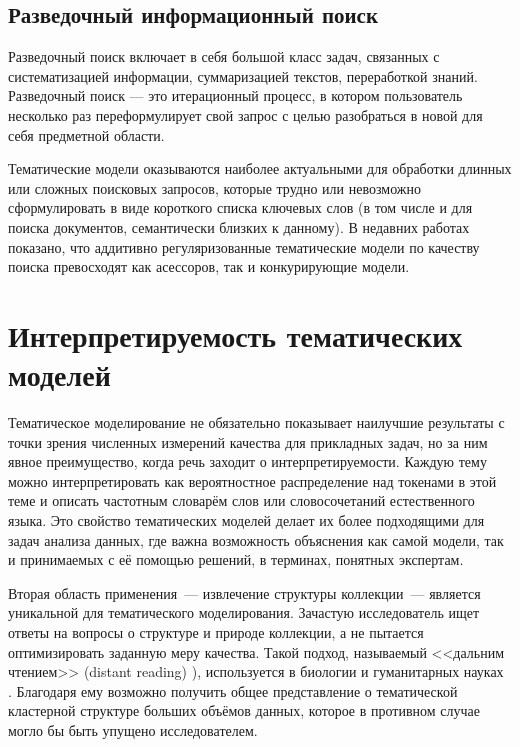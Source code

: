 \subsection{Разведочный информационный поиск}

Разведочный поиск включает в себя большой класс задач, связанных с систематизацией информации, суммаризацией текстов, переработкой знаний. Разведочный поиск --- это итерационный процесс, в котором пользователь несколько раз переформулирует свой запрос с целью разобраться в новой для себя предметной области. 

Тематические модели оказываются наиболее актуальными для обработки длинных или сложных поисковых запросов, которые трудно  или невозможно сформулировать в виде короткого списка ключевых слов (в том числе и для поиска документов, семантически близких к данному). В недавних работах \cite{ianina2017multi, ianina2019regularized} показано, что аддитивно регуляризованные тематические модели по качеству поиска превосходят как асессоров, так и конкурирующие модели.

\section{Интерпретируемость тематических моделей}

Тематическое моделирование не обязательно показывает наилучшие результаты с точки зрения численных измерений качества для прикладных задач, но за ним явное преимущество, когда речь заходит о интерпретируемости. Каждую тему можно интерпретировать как вероятностное распределение над токенами в этой теме и описать частотным словарём слов или словосочетаний естественного языка. Это свойство тематических моделей делает их более подходящими для задач анализа данных, где важна возможность объяснения как самой модели, так и принимаемых с её помощью решений, в терминах, понятных экспертам.

Вторая область применения~--- извлечение структуры коллекции~--- является уникальной для тематического моделирования. Зачастую исследователь ищет ответы на вопросы о структуре и природе коллекции, а не пытается оптимизировать заданную меру качества. Такой подход, называемый <<дальним чтением>> (distant reading) \cite{milkova2019distant}), используется в  биологии \cite{Liu2016,funnell2019integrated} и гуманитарных науках \cite{fntir2017applications,antons2019content}. Благодаря ему возможно получить общее представление о тематической кластерной структуре больших объёмов данных, которое в противном случае могло бы быть упущено исследователем.

